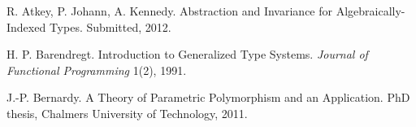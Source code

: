 \documentclass[a4paper,11pt]{article}
\begin{document}
{%


\begin{thebibliography}{}

\vspace*{-0.25in}

\setlength{\parindent}{0in}
\setlength{\columnsep}{0.3in}
\setlength{\parskip}{-0.1ex}

\begin{multicols}{2}









R. Atkey, P. Johann, A. Kennedy. Abstraction and Invariance for
Algebraically-Indexed Types. Submitted, 2012.




H. P. Barendregt. Introduction to Generalized Type Systems. {\em
  Journal of Functional Programming} 1(2), 1991.

J.-P. Bernardy. A Theory of Parametric Polymorphism and an
Application. PhD thesis, Chalmers University of Technology, 2011.


\end{multicols}
\end{thebibliography}}
\end{document}
